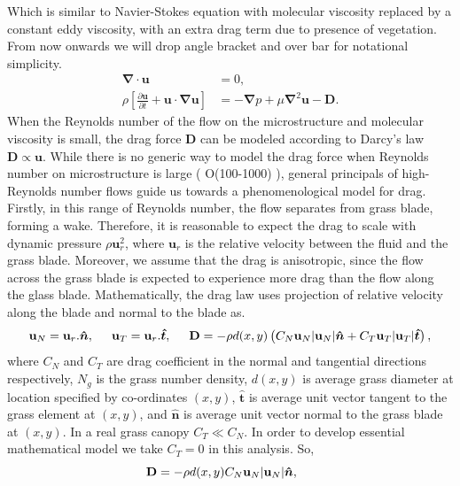 \documentclass[12pt]{report}   %
\newcommand{\bn}{{\boldsymbol{\hat{n}}}}
\newcommand{\bt}{{\boldsymbol{\hat{t}}}}
\newcommand{\bu}{\mathbf{u}}
\newcommand{\grad}{\mathbf{\nabla}}
\begin{document}
Which is similar to Navier-Stokes equation with molecular viscosity replaced by a constant eddy viscosity, with an extra drag term due to presence of vegetation. From now onwards we will drop angle bracket and over bar for notational simplicity.
\begin{equation}\label{averaged_eq}
\begin{split}
  \grad \cdot {\bu}&=0, \\
 \rho \left[ \frac{\partial {\bu}  }{\partial t}+  {\bu} \cdot \grad \bu  \right ] &= - \grad{p}  +\mu \grad^2\bu - \mathbf{D} .
\end{split}
\end{equation}
When the Reynolds number of the flow on the microstructure and molecular viscosity is small, the drag force $\mathbf{D}$ can be modeled according to Darcy's law $\mathbf{D} \propto \bu$. While there is no generic way to model the drag force when Reynolds number on microstructure is large ( O(100-1000) ), general principals of high-Reynolds number flows guide us towards a phenomenological model for drag. Firstly, in this range of Reynolds number, the flow separates from grass blade, forming a wake. Therefore, it is reasonable to expect the drag to scale with dynamic pressure $\rho \bu_r^2$, where $\bu_r$ is the relative velocity between the fluid and the grass blade. Moreover, we assume that the drag is anisotropic, since the flow across the grass blade is expected to experience more drag than the flow along the glass blade. Mathematically, the drag law uses projection of relative velocity along the blade and normal to the blade as.
\begin{equation}
 \bu_N = \bu_r.\bn,\hspace{0.5cm} \bu_T = \bu_r.\bt,\hspace{.5cm} \mathbf{D} = -\rho d(x,y)\left( C_N \bu_N |\bu_N|\bn + C_T \bu_T |\bu_T| \bt \right),
\end{equation} 
where $C_N$ and $C_T$ are drag coefficient in the normal and tangential directions respectively, $N_g$ is the grass number density, $d(x,y)$ is average grass diameter at location specified by co-ordinates $(x,y)$, $\bt$ is average unit vector tangent to the grass element at $(x,y)$, and $\bn$ is average unit vector normal to the grass blade at $(x,y)$. In a real grass canopy $C_T \ll C_N$. In order to develop essential mathematical model we take $C_T=0$ in this analysis. So,
\begin{equation}
 \mathbf{D} = -\rho d(x,y) C_N \bu_N |\bu_N| \bn, \hspace{.5cm} %
\end{equation}
\end{document}
